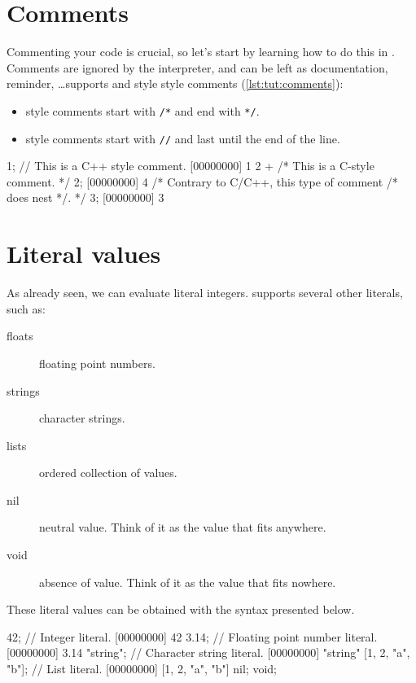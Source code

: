 \section{Comments}

Commenting your code is crucial, so let's start by learning how to do
this in \us. Comments are ignored by the interpreter, and
can be left as documentation, reminder, \ldots \us supports \C and
\Cxx style style comments (\autoref{lst:tut:comments}):

\begin{itemize}
\item \C style comments start with \texttt{/*} and end with \texttt{*/}.
\item \Cxx style comments start with \texttt{//} and last until the
  end of the line.
\end{itemize}


\begin{urbiscript}[caption=Comments in \us, label=lst:tut:comments]
1; // This is a C++ style comment.
[00000000] 1
2 + /* This is a C-style comment. */ 2;
[00000000] 4
/* Contrary to C/C++, this type of comment /* does nest */. */
3;
[00000000] 3
\end{urbiscript}


\section{Literal values}

As already seen, we can evaluate literal integers. \us supports
several other literals, such as:

\begin{description}
\item[floats] floating point numbers.
\item[strings] character strings.
\item[lists] ordered collection of values.
\item[nil] neutral value. Think of it as the value that fits anywhere.
\item[void] absence of value. Think of it as the value that fits nowhere.
\end{description}

These literal values can be obtained with the syntax presented below.

\begin{urbiscript}
42; // Integer literal.
[00000000] 42
3.14; // Floating point number literal.
[00000000] 3.14
"string"; // Character string literal.
[00000000] "string"
[1, 2, "a", "b"]; // List literal.
[00000000] [1, 2, "a", "b"]
nil;
void;
\end{urbiscript}

